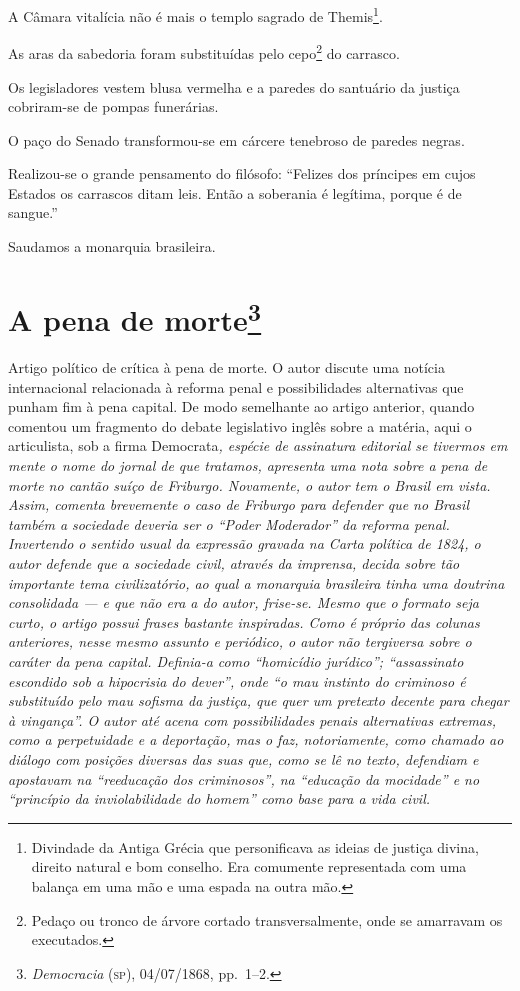 A Câmara vitalícia não é mais o templo sagrado de Themis\footnote{
  Divindade da Antiga Grécia que personificava as ideias de justiça
  divina, direito natural e bom conselho. Era comumente representada com
  uma balança em uma mão e uma espada na outra mão.}.

As aras da sabedoria foram substituídas pelo cepo\footnote{Pedaço ou
  tronco de árvore cortado transversalmente, onde se amarravam os
  executados.} do carrasco.

Os legisladores vestem blusa vermelha e a paredes do santuário da
justiça cobriram-se de pompas funerárias.

O paço do Senado transformou-se em cárcere tenebroso de paredes negras.

Realizou-se o grande pensamento do filósofo: ``Felizes dos príncipes em
cujos Estados os carrascos ditam leis. Então a soberania é legítima,
porque é de sangue.''

Saudamos a monarquia brasileira.

\chapter{A pena de morte\footnote{\emph{Democracia} (\textsc{sp}), 04/07/1868, pp.~1--2.}}

\begin{didascalia}
Artigo político de crítica à pena de morte. O autor discute uma notícia
internacional relacionada à reforma penal e possibilidades alternativas
que punham fim à pena capital. De modo semelhante ao artigo anterior,
quando comentou um fragmento do debate legislativo inglês sobre a
matéria, aqui o articulista, sob a firma Democrata\emph{, espécie de
assinatura editorial se tivermos em mente o nome do jornal de que
tratamos, apresenta uma nota sobre a pena de morte no cantão suíço de
Friburgo. Novamente, o autor tem o Brasil em vista. Assim, comenta
brevemente o caso de Friburgo para defender que no Brasil também a
sociedade deveria ser o ``Poder Moderador'' da reforma penal. Invertendo o
sentido usual da expressão gravada na Carta política de 1824, o autor
defende que a sociedade civil, através da imprensa, decida sobre tão
importante tema civilizatório, ao qual a monarquia brasileira tinha uma
doutrina consolidada --- e que não era a do autor, frise-se. Mesmo que o
formato seja curto, o artigo possui frases bastante inspiradas. Como é
próprio das colunas anteriores, nesse mesmo assunto e periódico, o autor
não tergiversa sobre o caráter da pena capital. Definia-a como
``homicídio jurídico''; ``assassinato escondido sob a hipocrisia do dever'',
onde ``o mau instinto do criminoso é substituído pelo mau sofisma da
justiça, que quer um pretexto decente para chegar à vingança''. O autor
até acena com possibilidades penais alternativas extremas, como a
perpetuidade e a deportação, mas o faz, notoriamente, como chamado ao
diálogo com posições diversas das suas que, como se lê no texto,
defendiam e apostavam na ``reeducação dos criminosos'', na ``educação da
mocidade'' e no ``princípio da inviolabilidade do homem'' como base para a
vida civil.}
\end{didascalia}



